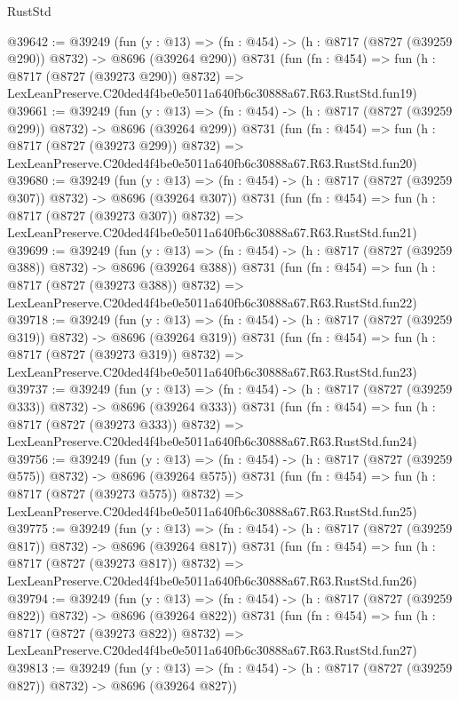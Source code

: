 \begin{lexlean}{RustStd}
\begin{coremodule}
@39642 := @39249
    (fun (y : @13) => (fn : @454) -> (h : @8717 (@8727 (@39259 @290)) @8732) -> @8696 (@39264 @290))
    @8731
    (fun (fn : @454) =>
    fun (h : @8717 (@8727 (@39273 @290)) @8732) =>
    LexLeanPreserve.C20ded4f4be0e5011a640fb6c30888a67.R63.RustStd.fun19)
@39661 := @39249
    (fun (y : @13) => (fn : @454) -> (h : @8717 (@8727 (@39259 @299)) @8732) -> @8696 (@39264 @299))
    @8731
    (fun (fn : @454) =>
    fun (h : @8717 (@8727 (@39273 @299)) @8732) =>
    LexLeanPreserve.C20ded4f4be0e5011a640fb6c30888a67.R63.RustStd.fun20)
@39680 := @39249
    (fun (y : @13) => (fn : @454) -> (h : @8717 (@8727 (@39259 @307)) @8732) -> @8696 (@39264 @307))
    @8731
    (fun (fn : @454) =>
    fun (h : @8717 (@8727 (@39273 @307)) @8732) =>
    LexLeanPreserve.C20ded4f4be0e5011a640fb6c30888a67.R63.RustStd.fun21)
@39699 := @39249
    (fun (y : @13) => (fn : @454) -> (h : @8717 (@8727 (@39259 @388)) @8732) -> @8696 (@39264 @388))
    @8731
    (fun (fn : @454) =>
    fun (h : @8717 (@8727 (@39273 @388)) @8732) =>
    LexLeanPreserve.C20ded4f4be0e5011a640fb6c30888a67.R63.RustStd.fun22)
@39718 := @39249
    (fun (y : @13) => (fn : @454) -> (h : @8717 (@8727 (@39259 @319)) @8732) -> @8696 (@39264 @319))
    @8731
    (fun (fn : @454) =>
    fun (h : @8717 (@8727 (@39273 @319)) @8732) =>
    LexLeanPreserve.C20ded4f4be0e5011a640fb6c30888a67.R63.RustStd.fun23)
@39737 := @39249
    (fun (y : @13) => (fn : @454) -> (h : @8717 (@8727 (@39259 @333)) @8732) -> @8696 (@39264 @333))
    @8731
    (fun (fn : @454) =>
    fun (h : @8717 (@8727 (@39273 @333)) @8732) =>
    LexLeanPreserve.C20ded4f4be0e5011a640fb6c30888a67.R63.RustStd.fun24)
@39756 := @39249
    (fun (y : @13) => (fn : @454) -> (h : @8717 (@8727 (@39259 @575)) @8732) -> @8696 (@39264 @575))
    @8731
    (fun (fn : @454) =>
    fun (h : @8717 (@8727 (@39273 @575)) @8732) =>
    LexLeanPreserve.C20ded4f4be0e5011a640fb6c30888a67.R63.RustStd.fun25)
@39775 := @39249
    (fun (y : @13) => (fn : @454) -> (h : @8717 (@8727 (@39259 @817)) @8732) -> @8696 (@39264 @817))
    @8731
    (fun (fn : @454) =>
    fun (h : @8717 (@8727 (@39273 @817)) @8732) =>
    LexLeanPreserve.C20ded4f4be0e5011a640fb6c30888a67.R63.RustStd.fun26)
@39794 := @39249
    (fun (y : @13) => (fn : @454) -> (h : @8717 (@8727 (@39259 @822)) @8732) -> @8696 (@39264 @822))
    @8731
    (fun (fn : @454) =>
    fun (h : @8717 (@8727 (@39273 @822)) @8732) =>
    LexLeanPreserve.C20ded4f4be0e5011a640fb6c30888a67.R63.RustStd.fun27)
@39813 := @39249
    (fun (y : @13) => (fn : @454) -> (h : @8717 (@8727 (@39259 @827)) @8732) -> @8696 (@39264 @827))

\end{coremodule}
\end{lexlean}
